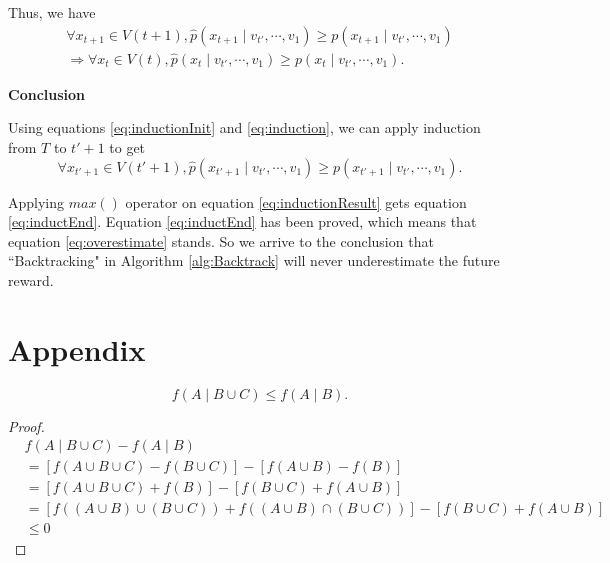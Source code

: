 \documentclass[12pt]{article}
\begin{document}
Thus, we have
\begin{equation}
\label{eq:induction}
\begin{aligned}
\forall x_{t+1} \in V(t+1), \hat{p}( x_{t+1} \mid v_{t'} , \cdots , v_{1} ) \geq p( x_{t+1} \mid v_{t'} , \cdots , v_{1} )  \\
\Rightarrow  \forall x_{t} \in V(t), \hat{p}( x_{t} \mid v_{t'} , \cdots , v_{1} ) \geq p( x_{t} \mid v_{t'} , \cdots , v_{1} ).
\end{aligned}
\end{equation}

\textbf{Conclusion}

Using equations \eqref{eq:inductionInit} and \eqref{eq:induction}, we can apply induction from $ T $ to $ t'+1 $ to get
\begin{equation}
\label{eq:inductionResult}
\forall x_{t'+1} \in V(t'+1), \hat{p}( x_{t'+1} \mid v_{t'} , \cdots , v_{1} ) \geq p( x_{t'+1} \mid v_{t'} , \cdots , v_{1} ).
\end{equation}

Applying $ max() $ operator on equation \eqref{eq:inductionResult} gets equation \eqref{eq:inductEnd}.
Equation \eqref{eq:inductEnd} has been proved, which means that equation \eqref{eq:overestimate} stands.
So we arrive to the conclusion that ``Backtracking" in Algorithm \ref{alg:Backtrack} will never underestimate the future reward.

\section{Appendix}

\begin{lem}
\label{lem:cond_submod}
\begin{equation}
f(A \mid B \cup C) \leq f(A \mid B).
\end{equation}
\begin{proof}
\begin{equation}
\begin{aligned}
& f(A \mid B \cup C) - f(A \mid B) \\
& = \left[ f( A \cup B \cup C ) - f ( B \cup C ) \right]
- \left[ f ( A \cup B ) - f ( B )  \right] \\
& = \left[ f( A \cup B \cup C ) + f ( B ) \right] 
- \left[ f ( B \cup C ) + f ( A \cup B ) \right] \\
& = \left[ f( (A \cup B) \cup (B \cup C) ) + f ( (A \cup B) \cap (B \cup C) )  \right]
- \left[ f ( B \cup C ) + f ( A \cup B ) \right] \\
& \leq 0
\end{aligned}
\end{equation}

\end{proof}
\end{lem}


%
%
\end{document}
